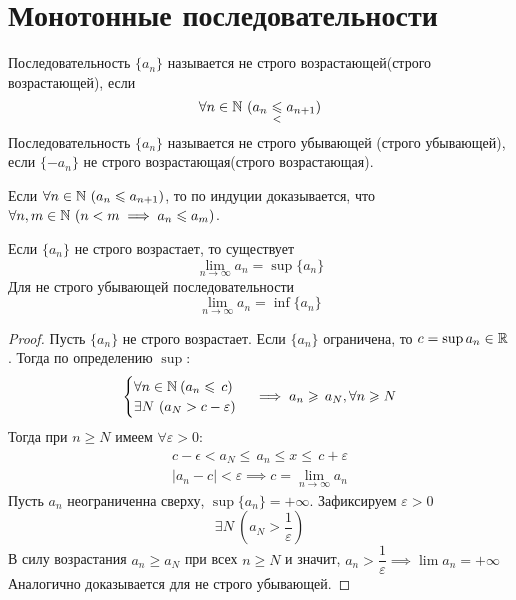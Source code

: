 \section{Монотонные последовательности}
\begin{definition}
    Последовательность $ \{a_n\} $ называется не строго возрастающей(строго возрастающей), если \begin{equation}
        \forall n \in \mathbb{N} \ (a_n \underset{ <}{ \leqslant} a_{n + 1})
    \end{equation}
    Последовательность $ \{a_n\} $ называется не строго убывающей (строго убывающей), если $ \{- a_n\} $ не строго возрастающая(строго возрастающая).
\end{definition}
\begin{note}
    Если $ \forall  n \in \mathbb{N}\ (a_n \leqslant  a_{n + 1}) $, то по индуции доказывается, что $ \forall  n, m \in \mathbb{N}\ (n < m \implies  a_n \leqslant  a_m) $.
\end{note}
\begin{theorem} \label{Weierstrass_theorem}
    Если $ \{a_n\} $ не строго возрастает, то существует \[ \lim_{n \to \infty}a_n = \sup\{a_n\} \]
    Для не строго убывающей последовательности \[ \lim_{n \to \infty}a_n = \inf\{a_n\} \]
\end{theorem}
\begin{proof}
    Пусть $ \{a_n\} $ не строго возрастает. Если $ \{a_n\} $ ограничена, то $ c = \sup{a_n} \in  \mathbb{R} $. Тогда по определению $ \sup $: \begin{gather} \begin{cases}
        \forall n \in \mathbb{N}\:  (a_n \leqslant\, c) \\
        \exists N \ (a_N > c - \varepsilon)
    \end{cases} \implies a_n \geqslant\, a_N, \forall n \geqslant N
    \end{gather}
    Тогда при $ n \geq  N $ имеем $ \forall \varepsilon > 0 $: \begin{gather}
        c - \epsilon < a_N \leq\, a_n \leq x \leq\, c + \varepsilon \\
        |a_n - c | < \varepsilon \implies c = \lim_{n \to \infty} a_n
    \end{gather}
    Пусть $ a_n $ неограниченна сверху, $ \sup\{a_n\} = + \infty $. Зафиксируем $ \varepsilon > 0 $ \begin{equation}
        \exists N \ \left(a_N > \frac{1}{\varepsilon}\right)
    \end{equation} В силу возрастания $ a_n \geq a_N $ при всех $ n \geq  N $ и значит, $ a_n > \dfrac{1}{\varepsilon}  \implies  \lim a_n = + \infty$
    Аналогично доказывается для не строго убывающей.
\end{proof}

